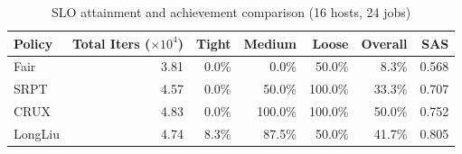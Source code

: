 \begin{table}[t]
\centering
\caption{SLO attainment and achievement comparison (16 hosts, 24 jobs)}
\label{tab:slo_16host}
\begin{tabular}{l|r|r|r|r|r|r}
\hline
Policy & Total Iters ($\times 10^4$) & Tight & Medium & Loose & Overall & SAS \\
\hline
Fair & 3.81 & 0.0\% & 0.0\% & 50.0\% & 8.3\% & 0.568 \\
SRPT & 4.57 & 0.0\% & 50.0\% & 100.0\% & 33.3\% & 0.707 \\
CRUX & 4.83 & 0.0\% & 100.0\% & 100.0\% & 50.0\% & 0.752 \\
LongLiu & 4.74 & 8.3\% & 87.5\% & 50.0\% & 41.7\% & 0.805 \\
\hline
\end{tabular}
\end{table}
